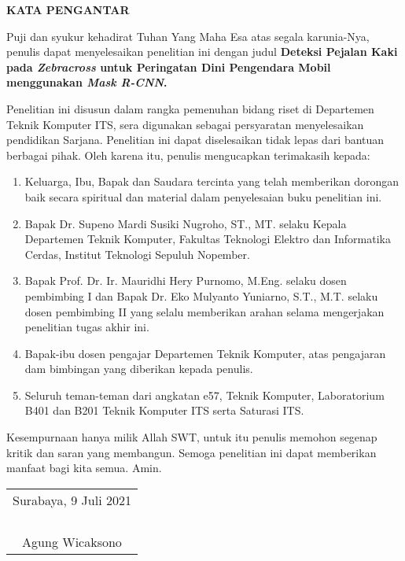 \begin{center}
  \Large
  \textbf{KATA PENGANTAR}
\end{center}


Puji dan syukur kehadirat Tuhan Yang Maha Esa atas segala karunia-Nya, penulis  dapat menyelesaikan penelitian ini dengan judul \textbf{Deteksi Pejalan Kaki pada \textit{Zebracross} untuk Peringatan Dini Pengendara Mobil menggunakan \textit{Mask R-CNN}.}

Penelitian ini disusun dalam rangka pemenuhan bidang riset di Departemen Teknik Komputer ITS, sera digunakan sebagai persyaratan menyelesaikan pendidikan Sarjana. Penelitian ini dapat diselesaikan tidak lepas dari bantuan berbagai pihak. Oleh karena itu, penulis mengucapkan terimakasih kepada:

\begin{enumerate}[nolistsep]
  \item Keluarga, Ibu, Bapak dan Saudara tercinta yang telah memberikan dorongan baik secara spiritual dan material dalam penyelesaian buku penelitian ini.
  \item Bapak Dr. Supeno Mardi Susiki Nugroho, ST., MT. selaku Kepala Departemen Teknik Komputer, Fakultas Teknologi Elektro dan Informatika Cerdas, Institut Teknologi Sepuluh Nopember. 
  \item Bapak Prof. Dr. Ir. Mauridhi Hery Purnomo, M.Eng. selaku dosen pembimbing I dan Bapak Dr. Eko Mulyanto Yuniarno, S.T., M.T. selaku dosen pembimbing II yang selalu memberikan arahan selama mengerjakan penelitian tugas akhir ini.
  \item Bapak-ibu dosen pengajar Departemen Teknik Komputer, atas pengajaran dam bimbingan yang diberikan kepada penulis.
  \item Seluruh teman-teman dari angkatan e57, Teknik Komputer, Laboratorium B401 dan B201 Teknik Komputer ITS serta Saturasi ITS.
\end{enumerate}

Kesempurnaan hanya milik Allah SWT, untuk itu penulis memohon segenap kritik dan saran yang membangun. Semoga penelitian ini dapat memberikan manfaat bagi kita semua. Amin.


\begin{flushright}
  \begin{tabular}[b]{c}
    Surabaya, 9 Juli 2021\\
    \\
    \\
    \\
    \\
    Agung Wicaksono
  \end{tabular}
\end{flushright}
